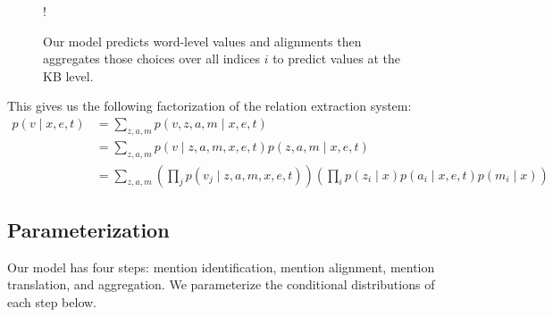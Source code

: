 \documentclass[12pt]{article}
\begin{document}
\begin{figure}[h]
\begin{center}
\resizebox {.3\columnwidth} {!} {
} %
\end{center}
\caption{Our model predicts word-level values and alignments
then aggregates those choices over all indices $i$ to
predict values at the KB level.
}
\label{fig:infmodel}
\end{figure}

This gives us the following factorization of the relation extraction system:
\begin{equation}
\label{eqn:prob}
\begin{aligned}
p(v \mid x,e,t) &= \sum_{z,a,m} p(v,z,a,m\mid x,e,t)\\
&= \sum_{z,a,m} p(v\mid z,a,m,x,e,t) p(z, a, m\mid x,e,t)\\
&= \sum_{z,a,m} \left(\prod_j p(v_j\mid z,a,m,x,e,t)\right)
\left(\prod_i p(z_i\mid x)p(a_i\mid x,e,t)p(m_i\mid x)\right)
\end{aligned}
\end{equation}

\subsection{Parameterization}
Our model has four steps: mention identification, mention alignment, 
mention translation, and aggregation.
We parameterize the conditional distributions of each step below.
\end{document}
